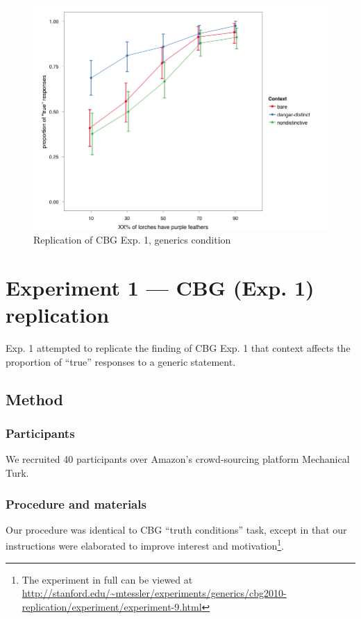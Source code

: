 \documentclass[10pt,letterpaper]{article}
\begin{document}
\begin{figure}
\centering
    \includegraphics[width=\columnwidth]{fig1_replication}
    \caption{Replication of CBG Exp. 1, generics condition}
  \label{fig:replication}
\end{figure}

\section{Experiment 1 --- CBG (Exp. 1) replication}

Exp. 1 attempted to replicate the finding of CBG Exp. 1 that context affects the proportion of ``true'' responses to a generic statement. 

\subsection{Method}

\subsubsection{Participants}

We recruited 40 participants over Amazon's crowd-sourcing platform Mechanical Turk. 

\subsubsection{Procedure and materials}

Our procedure was identical to CBG ``truth conditions'' task, except in that our instructions were elaborated to improve interest and motivation\footnote{The experiment in full can be viewed at \url{http://stanford.edu/~mtessler/experiments/generics/cbg2010-replication/experiment/experiment-9.html}}. 
\end{document}
